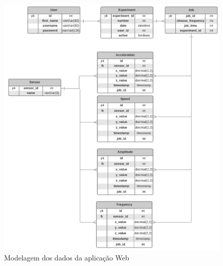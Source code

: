 \begin{figure}[H]
\centering
\includegraphics[keepaspectratio=true,scale=0.4]{figuras/visao_de_dados.png}
\caption{Modelagem dos dados da aplicação Web}
\label{fig:visao_de_dados_2}
\end{figure}

